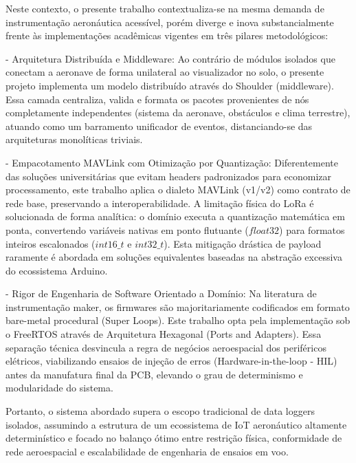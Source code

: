 Neste contexto, o presente trabalho contextualiza-se na mesma demanda de instrumentação aeronáutica acessível, porém diverge e inova substancialmente frente às implementações acadêmicas vigentes em três pilares metodológicos:

- Arquitetura Distribuída e Middleware: Ao contrário de módulos isolados que conectam a aeronave de forma unilateral ao visualizador no solo, o presente projeto implementa um modelo distribuído através do Shoulder (middleware). Essa camada centraliza, valida e formata os pacotes provenientes de nós completamente independentes (sistema da aeronave, obstáculos e clima terrestre), atuando como um barramento unificador de eventos, distanciando-se das arquiteturas monolíticas triviais.

- Empacotamento MAVLink com Otimização por Quantização: Diferentemente das soluções universitárias que evitam headers padronizados para economizar processamento, este trabalho aplica o dialeto MAVLink (v1/v2) como contrato de rede base, preservando a interoperabilidade. A limitação física do LoRa é solucionada de forma analítica: o domínio executa a quantização matemática em ponta, convertendo variáveis nativas em ponto flutuante ($float32$) para formatos inteiros escalonados ($int16\_t$ e $int32\_t$). Esta mitigação drástica de payload raramente é abordada em soluções equivalentes baseadas na abstração excessiva do ecossistema Arduino.

- Rigor de Engenharia de Software Orientado a Domínio: Na literatura de instrumentação maker, os firmwares são majoritariamente codificados em formato bare-metal procedural (Super Loops). Este trabalho opta pela implementação sob o FreeRTOS através de Arquitetura Hexagonal (Ports and Adapters). Essa separação técnica desvincula a regra de negócios aeroespacial dos periféricos elétricos, viabilizando ensaios de injeção de erros (Hardware-in-the-loop - HIL) antes da manufatura final da PCB, elevando o grau de determinismo e modularidade do sistema.

Portanto, o sistema abordado supera o escopo tradicional de data loggers isolados, assumindo a estrutura de um ecossistema de IoT aeronáutico altamente determinístico e focado no balanço ótimo entre restrição física, conformidade de rede aeroespacial e escalabilidade de engenharia de ensaios em voo.
